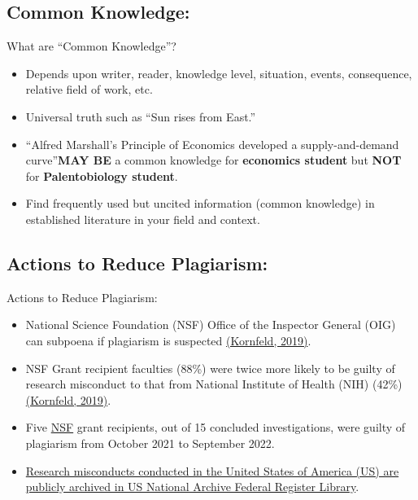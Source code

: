 \documentclass[11pt]{beamer}
\begin{document}
\subsection{Common Knowledge:}
\begin{frame}{What are \textquotedblleft Common Knowledge\textquotedblright?}
	\begin{itemize}
		\item Depends upon writer, reader, knowledge level, situation, events, consequence, relative field of work, etc.
		\smallskip
		\item Universal truth such as \textquotedblleft Sun rises from East.\textquotedblright
		\smallskip
		\item \textquotedblleft Alfred Marshall's Principle of Economics developed a supply-and-demand curve\textquotedblright \textbf{MAY BE} a common knowledge for \textbf{economics student} but \textbf{NOT} for \textbf{Palentobiology student}.
		\smallskip
		\item Find frequently used but uncited information (common knowledge) in established literature in your field and context.
	\end{itemize}
\end{frame}

\subsection{Actions to Reduce Plagiarism:}
\begin{frame}{Actions to Reduce Plagiarism:}
	\begin{itemize}				
		\item National Science Foundation (NSF) Office of the Inspector General (OIG) can subpoena if plagiarism is suspected {\color{blue}\href{https://pubmed.ncbi.nlm.nih.gov/31324124/}{(Kornfeld, 2019)}}.
		\smallskip
		\item NSF Grant recipient faculties (88\%) were twice more likely to be guilty of research misconduct to that from National Institute of Health (NIH) (42\%) {\color{blue}\href{https://pubmed.ncbi.nlm.nih.gov/31324124/}{(Kornfeld, 2019)}}.
		\smallskip		
		\item Five {\color{blue}\href{https://oig.nsf.gov/investigations/research-misconduct/by-the-numbers}{NSF}} grant recipients, out of 15 concluded investigations, were guilty of plagiarism from October 2021 to September 2022.
		\smallskip
		\item {\color{blue}\href{		https://www.govinfo.gov/content/pkg/FR-2022-03-17/pdf/2022-05659.pdf}{Research misconducts conducted in the United States of America (US) are publicly archived in US National Archive Federal Register Library}}.
	\end{itemize}
\end{frame}
\end{document}
